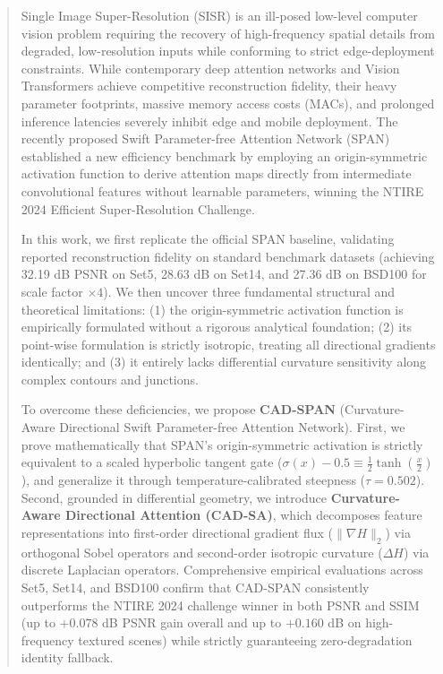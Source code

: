 \documentclass[conference]{IEEEtran}
\begin{document}
\begin{abstract}
Single Image Super-Resolution (SISR) is an ill-posed low-level computer vision problem requiring the recovery of high-frequency spatial details from degraded, low-resolution inputs while conforming to strict edge-deployment constraints. While contemporary deep attention networks and Vision Transformers achieve competitive reconstruction fidelity, their heavy parameter footprints, massive memory access costs (MACs), and prolonged inference latencies severely inhibit edge and mobile deployment. The recently proposed Swift Parameter-free Attention Network (SPAN) established a new efficiency benchmark by employing an origin-symmetric activation function to derive attention maps directly from intermediate convolutional features without learnable parameters, winning the NTIRE 2024 Efficient Super-Resolution Challenge.

In this work, we first replicate the official SPAN baseline, validating reported reconstruction fidelity on standard benchmark datasets (achieving 32.19 dB PSNR on Set5, 28.63 dB on Set14, and 27.36 dB on BSD100 for scale factor $\times 4$). We then uncover three fundamental structural and theoretical limitations: (1) the origin-symmetric activation function is empirically formulated without a rigorous analytical foundation; (2) its point-wise formulation is strictly isotropic, treating all directional gradients identically; and (3) it entirely lacks differential curvature sensitivity along complex contours and junctions.

To overcome these deficiencies, we propose \textbf{CAD-SPAN} (Curvature-Aware Directional Swift Parameter-free Attention Network). First, we prove mathematically that SPAN's origin-symmetric activation is strictly equivalent to a scaled hyperbolic tangent gate ($\sigma(x) - 0.5 \equiv \frac{1}{2}\tanh(\frac{x}{2})$), and generalize it through temperature-calibrated steepness ($\tau = 0.502$). Second, grounded in differential geometry, we introduce \textbf{Curvature-Aware Directional Attention (CAD-SA)}, which decomposes feature representations into first-order directional gradient flux ($\|\nabla H\|_2$) via orthogonal Sobel operators and second-order isotropic curvature ($\Delta H$) via discrete Laplacian operators. Comprehensive empirical evaluations across Set5, Set14, and BSD100 confirm that CAD-SPAN consistently outperforms the NTIRE 2024 challenge winner in both PSNR and SSIM (up to $+0.078$ dB PSNR gain overall and up to $+0.160$ dB on high-frequency textured scenes) while strictly guaranteeing zero-degradation identity fallback.
\end{abstract}
\end{document}
